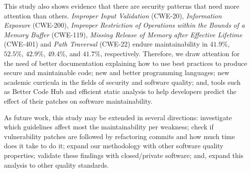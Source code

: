 \documentclass[10pt,conference]{IEEEtran}
\begin{document}
This study also shows evidence that there are security patterns that need more
attention than others. \emph{Improper Input Validation} (CWE-20), \emph{Information 
Exposure} (CWE-200), \emph{Improper Restriction of Operations within the Bounds of a 
Memory Buffer} (CWE-119), \emph{Missing Release of Memory after Effective Lifetime} 
(CWE-401) and \emph{Path Traversal} (CWE-22) endure maintainability
in $41.9\%$, $52.5\%$, $42.9\%$, $49.4\%$, and $41.7\%$, respectively. Therefore, 
we draw attention for the need of better documentation explaining 
how to use best practices to produce secure and maintainable code; 
new and better programming languages; new
academic curricula in the fields of security and software quality; and, 
tools such as Better Code Hub and efficient static analysis to help 
developers predict the effect of their patches on software maintainability.

As future work, this study may be extended in several directions: 
investigate which guidelines affect most the maintainability per
weakness; check if vulnerability patches are followed by refactoring
commits and how much time does it take to do it; 
expand our methodology with other software quality properties; 
validate these findings with closed/private
software; and, expand this analysis to other quality standards.

%
%
\balance

{
  
  
}
\end{document}
